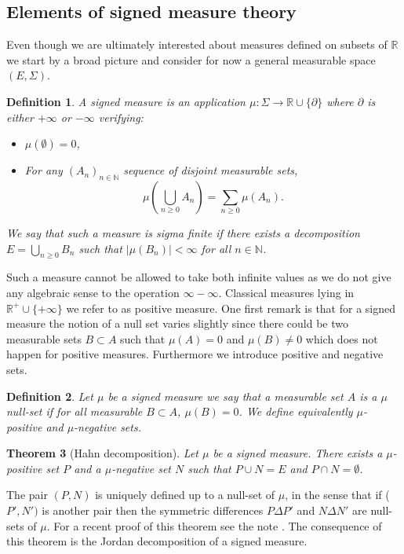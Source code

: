 \documentclass[11pt,a4paper]{article}
\newcommand{\RR}{\mathbb{R}}
\newcommand{\NN}{\mathbb{N}}
\newcommand{\Seq}[1]{\left(#1\right)_{n\in \mathbb{N}}}
\newtheorem{theorem}{Theorem}[section]
\newtheorem{definition}[theorem]{Definition}
\begin{document}
\subsection{Elements of signed measure theory}
Even though we are ultimately interested about measures defined on subsets of $\RR$ we start by a broad picture and consider for now a general measurable space $(E,\Sigma)$.
\begin{definition}
    A signed measure is an application $\mu : \Sigma \to \RR \cup\lbrace \partial \rbrace$ where $\partial $ is either $+\infty$ or $-\infty$ verifying:
    \begin{itemize}
        \item $\mu(\emptyset) = 0$,
        \item For any $\Seq{A_n}$ sequence of disjoint measurable sets,
        \[\mu \left( \bigcup\limits_{n \geq 0} A_n\right) = \sum\limits_{n \geq 0} \mu(A_n).\]
    \end{itemize}
    We say that such a measure is sigma finite if there exists a decomposition $E = \bigcup\limits_{n \geq 0} B_n$ such that $|\mu(B_n)| < \infty$ for all $n \in \NN$.
\end{definition}
Such a measure cannot be allowed to take both infinite values as we do not give any algebraic sense to the operation $\infty - \infty$. Classical measures lying in $\RR^+\cup\lbrace +\infty\rbrace$ we refer to as positive measure. One first remark is that for a signed measure the notion of a null set varies slightly since there could be two measurable sets $B\subset A$ such that $\mu(A) = 0$ and $\mu(B) \neq 0$ which does not happen for positive measures. Furthermore we introduce positive and negative sets.
\begin{definition}
    Let $\mu$ be a signed measure we say that a measurable set $A$ is a $\mu$ null-set if for all measurable $B \subset A$, $\mu(B) = 0$. We define equivalently $\mu$-positive and $\mu$-negative sets.
\end{definition}
\begin{theorem}[Hahn decomposition]
    Let $\mu$ be a signed measure. There exists a $\mu$-positive set $P$ and a $\mu$-negative set $N$ such that $P\cup N = E$ and $P\cap N = \emptyset$. 
\end{theorem}
The pair $(P,N)$ is uniquely defined up to a null-set of $\mu$, in the sense that if ($P',N')$ is another pair then the symmetric differences $P\Delta P'$ and $N\Delta N'$ are null-sets of $\mu$. For a recent proof of this theorem see the note \cite{fischer2012existence}. The consequence of this theorem is the Jordan decomposition of a signed measure.
\end{document}

